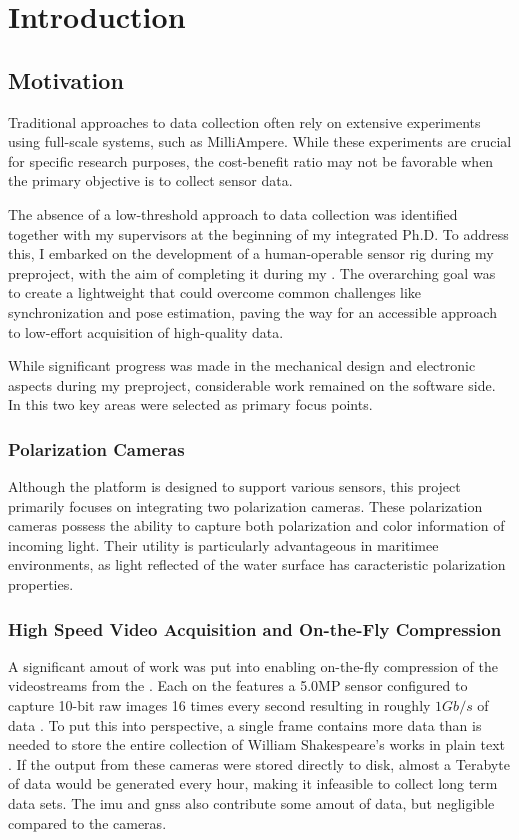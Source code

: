 \chapter{Introduction}

\section{Motivation}
Traditional approaches to data collection often rely on extensive experiments using full-scale systems, such as MilliAmpere.
While these experiments are crucial for specific research purposes, the cost-benefit ratio may not be favorable when the primary objective is to collect sensor data.

The absence of a low-threshold approach to data collection was identified together with my supervisors at the beginning of my integrated Ph.D.
To address this, I embarked on the development of a human-operable sensor rig during my preproject, with the aim of completing it during my \master.
The overarching goal was to create a lightweight \sr that could overcome common challenges like synchronization and pose estimation, paving the way for an accessible approach to low-effort acquisition of high-quality data.


While significant progress was made in the mechanical design and electronic aspects during my preproject, considerable work remained on the software side.
In this \master two key areas were selected as primary focus points.

\subsection{Polarization Cameras}
Although the \sr platform is designed to support various sensors, this \master project primarily focuses on integrating two polarization cameras.
These polarization cameras possess the ability to capture both polarization and color information of incoming light.
Their utility is particularly advantageous in maritimee environments, as light reflected of the water surface has caracteristic polarization properties.


\subsection{High Speed Video Acquisition and On-the-Fly Compression}
A significant amout of work was put into enabling on-the-fly compression of the videostreams from the \sr.
Each \cam on the \sr features a 5.0MP sensor configured to capture 10-bit raw images 16 times every second resulting in roughly $1Gb/s$ of data \cite{lucidvisionlabsTriton0MPPolarization}.
To put this into perspective, a single frame contains more data than is needed to store the entire collection of William Shakespeare's works in plain text \cite{projectgutenbergCompleteWorksWilliam1994}.
If the output from these cameras were stored directly to disk, almost a Terabyte of data would be generated every hour, making it infeasible to collect long term data sets.
The \gls{imu} and \gls{gnss} also contribute some amout of data, but negligible compared to the cameras.


